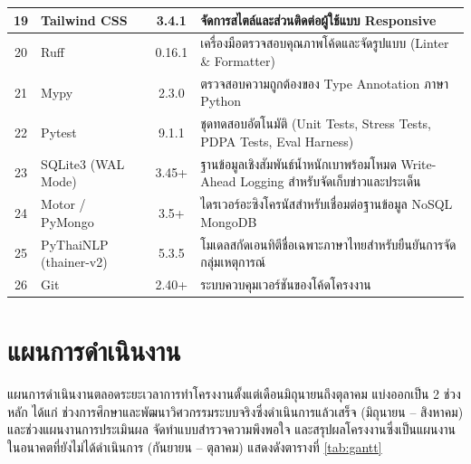 \begin{table}[H]
{\begin{tabular}{|c|l|c|p{7.2cm}|}
19 & Tailwind CSS & 3.4.1 & จัดการสไตล์และส่วนติดต่อผู้ใช้แบบ Responsive \\ \hline
20 & Ruff & 0.16.1 & เครื่องมือตรวจสอบคุณภาพโค้ดและจัดรูปแบบ (Linter \& Formatter) \\ \hline
21 & Mypy & 2.3.0 & ตรวจสอบความถูกต้องของ Type Annotation ภาษา Python \\ \hline
22 & Pytest & 9.1.1 & ชุดทดสอบอัตโนมัติ (Unit Tests, Stress Tests, PDPA Tests, Eval Harness) \\ \hline
23 & SQLite3 (WAL Mode) & 3.45+ & ฐานข้อมูลเชิงสัมพันธ์น้ำหนักเบาพร้อมโหมด Write-Ahead Logging สำหรับจัดเก็บข่าวและประเด็น \\ \hline
24 & Motor / PyMongo & 3.5+ & ไดรเวอร์อะซิงโครนัสสำหรับเชื่อมต่อฐานข้อมูล NoSQL MongoDB \\ \hline
25 & PyThaiNLP (thainer-v2) & 5.3.5 & โมเดลสกัดเอนทิตีชื่อเฉพาะภาษาไทยสำหรับยืนยันการจัดกลุ่มเหตุการณ์ \\ \hline
26 & Git & 2.40+ & ระบบควบคุมเวอร์ชันของโค้ดโครงงาน \\
\hline
\end{tabular}%
}
\end{table}

\section{แผนการดำเนินงาน}

แผนการดำเนินงานตลอดระยะเวลาการทำโครงงานตั้งแต่เดือนมิถุนายนถึงตุลาคม แบ่งออกเป็น 2 ช่วงหลัก ได้แก่ ช่วงการศึกษาและพัฒนาวิศวกรรมระบบจริงซึ่งดำเนินการแล้วเสร็จ (มิถุนายน -- สิงหาคม) และช่วงแผนงานการประเมินผล จัดทำแบบสำรวจความพึงพอใจ และสรุปผลโครงงานซึ่งเป็นแผนงานในอนาคตที่ยังไม่ได้ดำเนินการ (กันยายน -- ตุลาคม) แสดงดังตารางที่ \ref{tab:gantt}

